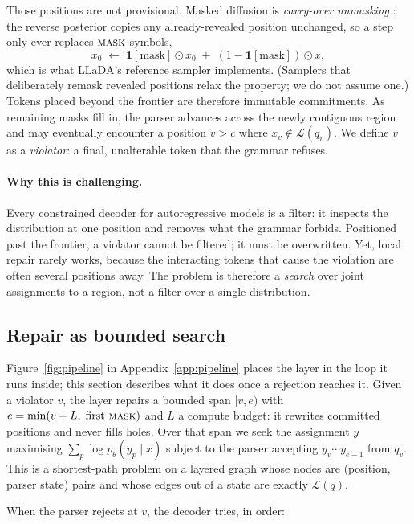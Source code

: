 \documentclass{article}
\begin{document}
Those positions are not provisional. Masked diffusion is \emph{carry-over
unmasking} \citep{sahoo2024simple,shi2024simplified}: the reverse posterior
copies any already-revealed position unchanged, so a step only ever replaces
$\textsc{mask}$ symbols,
\[
x_0 \;\leftarrow\; \mathbf{1}[\text{mask}]\odot x_0 \;+\; (1-\mathbf{1}[\text{mask}])\odot x ,
\]
which is what LLaDA's reference sampler implements. (Samplers that deliberately
remask revealed positions relax the property; we do not assume one.) Tokens
placed beyond the frontier are therefore immutable commitments. As remaining masks fill in, the parser advances across the newly contiguous region and may eventually encounter a position $v>c$ where $x_v\notin\mathcal{L}(q_v)$. We define $v$ as a \emph{violator}: a final, unalterable token that the grammar refuses.

\paragraph{Why this is challenging.}
Every constrained decoder for autoregressive models is a filter: it inspects the
distribution at one position and removes what the grammar forbids. Positioned past the frontier, a violator cannot be filtered; it must be overwritten. Yet, local repair rarely works, because the interacting tokens that cause the violation are often several positions away. The problem is therefore a \emph{search} over joint assignments
to a region, not a filter over a single distribution.

\subsection{Repair as bounded search}

Figure~\ref{fig:pipeline} in Appendix~\ref{app:pipeline} places the layer in the
loop it runs inside; this section describes what it does once a rejection
reaches it. Given a violator $v$, the layer repairs a bounded span $[v,e)$ with
$e=\min(v+L,\;\text{first }\textsc{mask})$ and $L$ a compute budget: it rewrites
committed positions and never fills holes. Over that span we seek the assignment
$y$ maximising $\sum_{p}\log p_\theta(y_p\mid x)$ subject to the parser
accepting $y_v\cdots y_{e-1}$ from $q_v$. This is a shortest-path problem on a
layered graph whose nodes are (position, parser state) pairs and whose edges out
of a state are exactly $\mathcal{L}(q)$.

When the parser rejects at $v$, the decoder tries, in order:
\end{document}
